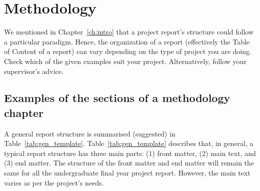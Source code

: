 \chapter{Methodology}
\label{ch:method} %

We mentioned in Chapter~\ref{ch:intro} %
that a project report's structure could follow a particular paradigm.
Hence, the organization of a report (effectively the Table of Content
of a report) can vary depending on the type of project you are doing.
Check which of the given examples suit your project. Alternatively,
follow your supervisor's advice.

\section{Examples of the sections of a methodology chapter}
A general report structure is summarised (suggested) in
Table~\ref{tab:gen_template}. Table~\ref{tab:gen_template} describes
that, in general, a typical report structure has three main parts:
(1) front matter, (2) main text, and (3) end matter. %
The structure of the front matter and end matter will remain the same
for all the undergraduate final year project report. However, the
main text varies as per the project's needs.
